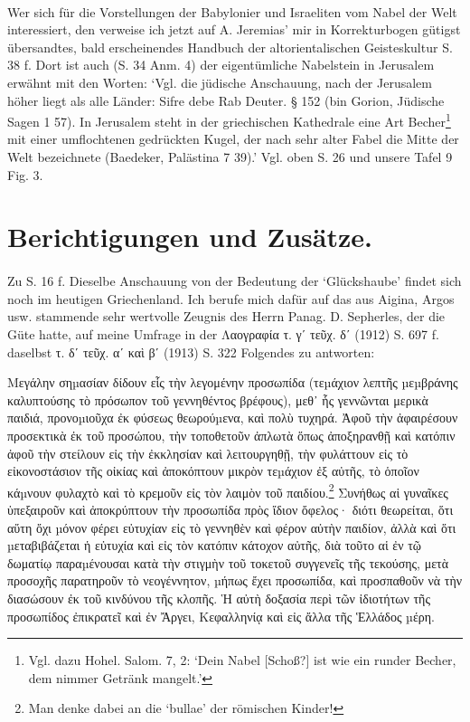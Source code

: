 \documentclass[a4paper, 11pt, oneside]{article}
\begin{document}
\paragraph{}
Wer sich für die Vorstellungen der Babylonier und Israeliten vom Nabel der Welt interessiert, den verweise ich jetzt auf A. Jeremias' mir in Korrekturbogen gütigst übersandtes, bald erscheinendes Handbuch der altorientalischen Geisteskultur S. 38 f. Dort ist auch (S. 34 Anm. 4) der eigentümliche Nabelstein in Jerusalem erwähnt mit den Worten: `Vgl. die jüdische Anschauung, nach der Jerusalem höher liegt als alle Länder: Sifre debe Rab Deuter. § 152 (bin Gorion, Jüdische Sagen 1 57). In Jerusalem steht in der griechischen Kathedrale eine Art Becher\footnote{Vgl. dazu Hohel. Salom. 7, 2: `Dein Nabel [Schoß?] ist wie ein runder Becher, dem nimmer Getränk mangelt.'} mit einer umflochtenen gedrückten Kugel, der nach sehr alter Fabel die Mitte der Welt bezeichnete (Baedeker, Palästina 7 39).' Vgl. oben S. 26 und unsere Tafel 9 Fig. 3.
\clearpage
\section{Berichtigungen und Zusätze.}
\paragraph{}
Zu S. 16 f. Dieselbe Anschauung von der Bedeutung der `Glückshaube' findet sich noch im heutigen Griechenland. Ich berufe mich dafür auf das aus Aigina, Argos usw. stammende sehr wertvolle Zeugnis des Herrn Panag. D. Sepherles, der die Güte hatte, auf meine Umfrage in der Λαογραφία τ. γʹ τεῦχ. δʹ (1912) S. 697 f. daselbst τ. δʹ τεῦχ. αʹ καὶ βʹ (1913) S. 322 Folgendes zu antworten:

Μεγάλην σηµασίαν δίδουν εἷς τὴν λεγομένην προσωπίδα (τεµάχιον λεπτῆς µεµβράνης καλυπτούσης τὸ πρόσωπον τοῦ γεννηθέντος βρέφους), μεθ᾽ ἧς γεννῶνται μερικὰ παιδιά, προνοµιοῦχα ἐκ φύσεως θεωρούµενα, καὶ πολὺ τυχηρά. Ἀφοῦ τὴν ἀφαιρέσουν προσεκτικὰ ἐκ τοῦ προσώπου, τὴν τοποθετοῦν ἀπλωτὰ ὅπως ἀποξηρανθῇ καὶ κατόπιν ἀφοῦ τὴν στείλουν εἰς τὴν ἐκκλησίαν καὶ λειτουργηθῇ, τὴν φυλάττουν εἰς τὸ εἰκονοστάσιον τῆς οἰκίας καὶ ἀποκόπτουν μικρὸν τεµάχιον ἐξ αὐτῆς, τὸ ὁποῖον κάµνουν φυλαχτὸ καὶ τὸ κρεμοῦν εἰς τὸν λαιμὸν τοῦ παιδίου.\footnote{Man denke dabei an die `bullae' der römischen Kinder!} Συνήθως αἱ γυναῖκες ὑπεξαιροῦν καὶ ἀποκρύπτουν τὴν προσωπίδα πρὸς ἴδιον ὄφελος· διότι θεωρείται, ὅτι αὕτη ὄχι µόνον φέρει εὐτυχίαν εἰς τὸ γεννηθὲν καὶ φέρον αὐτὴν παιδίον, ἀλλὰ καὶ ὅτι µεταβιβάζεται ἡ εὐτυχία καὶ εἰς τὸν κατόπιν κάτοχον αὐτῆς, διὰ τοῦτο αἱ ἐν τῷ δωματίῳ παραµένουσαι κατὰ τὴν στιγμὴν τοῦ τοκετοῦ συγγενεῖς τῆς τεκούσης, μετὰ προσοχῆς παρατηροῦν τὸ νεογέννητον, µήπως ἔχει προσωπίδα, καὶ προσπαθοῦν νὰ τὴν διασώσουν ἐκ τοῦ κινδύνου τῆς κλοπῆς. Ἡ αὐτὴ δοξασία περὶ τῶν ἰδιοτήτων τῆς προσωπίδος ἐπικρατεῖ καὶ ἐν Ἄργει, Κεφαλληνίᾳ καὶ εἰς ἄλλα τῆς Ἑλλάδος µέρη.
\end{document}
